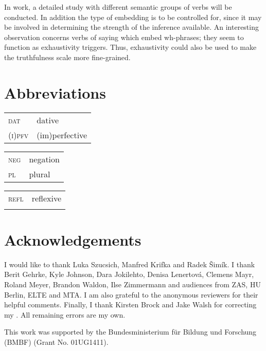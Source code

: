 \documentclass[output=paper,  modfonts,  newtxmath,  hidelinks		  ]{langscibook}
\begin{document}
In  work, a detailed study with different semantic groups of verbs will be conducted. In addition the type of embedding is to be controlled for, since it may be involved in determining the strength of the inference available. An interesting observation concerns  verbs of saying which embed wh-phrases; they seem to function as exhaustivity triggers. Thus, exhaustivity could also be used to make the truthfulness scale more fine-grained.
 




\section*{Abbreviations}
\begin{tabularx}{.333\textwidth}{@{}lQ@{}}
\textsc{dat} & {dative} \\
\textsc{(i)pfv} & (im){perfective}\\
\end{tabularx}%
\begin{tabularx}{.333\textwidth}{@{}lQ@{}}
\textsc{neg} & {negation}\\
\textsc{pl}&{plural}\\
\end{tabularx}%
\begin{tabularx}{.333\textwidth}{@{}lQ@{}}
\textsc{refl}&reflexive\\
{}&{}\\
\end{tabularx}

 \section*{Acknowledgements}
I would like to thank Luka Szucsich, Manfred Krifka and Radek \v{S}imík. I thank Berit Gehrke, Kyle Johnson, Dara Jokilehto, Denisa Lenertová, Clemens Mayr, Roland Meyer, Brandon Waldon, Ilse Zimmermann and audiences from ZAS, HU Berlin, ELTE and MTA. I am also grateful to the anonymous reviewers for their helpful comments. Finally, I thank Kirsten Brock and Jake Walsh for correcting my . All remaining errors are my own.

This work was supported by the  Bundesministerium für Bildung und Forschung (BMBF) (Grant No. 01UG1411).

\sloppy
\printbibliography[heading=subbibliography,notkeyword=this]
\end{document}
